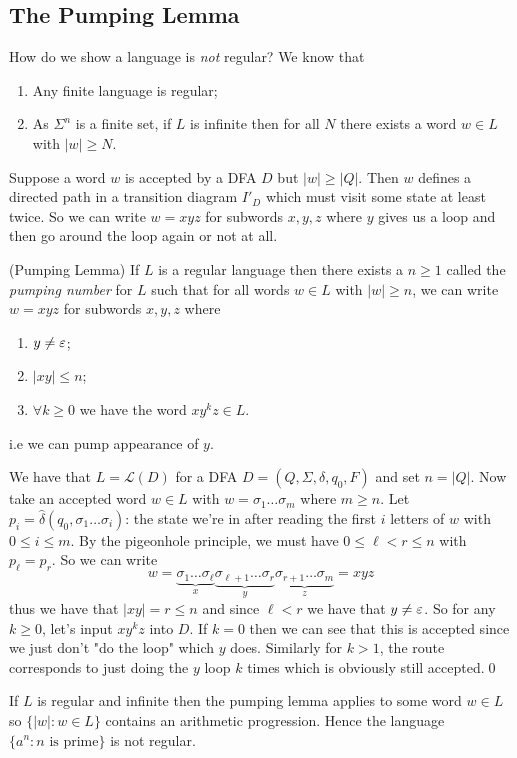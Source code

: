 \documentclass[tikx, border = 10pt]{article}
\begin{document}
\subsection{The Pumping Lemma}
How do we show a language is \textit{not} regular? We know that
\begin{enumerate}
	\item Any finite language is regular;
	\item As $ \Sigma^n $ is a finite set, if $ L $ is infinite then for all $ N $ there exists a word $ w\in L $ with $ |w| \ge N $.
\end{enumerate}
Suppose a word $ w $ is accepted by a DFA $ D $ but $ |w|\ge |Q| $. Then $ w $ defines a directed path in a transition diagram $ I'_D $ which must visit some state at least twice. So we can write $ w = xyz $ for subwords $ x,y,z $ where $ y $ gives us a loop and then go around the loop again or not at all.
\begin{theorem}
	(Pumping Lemma) If $ L $ is a regular language then there exists a $ n\ge 1 $ called the \textit{pumping number} for $ L $ such that for all words $ w\in L $ with $ |w|\ge n $, we can write $ w=xyz $ for subwords $ x,y,z $ where
	\begin{enumerate}
		\item $ y\ne \varepsilon $;
		\item $ |xy|\le n $;
		\item $ \forall k\ge 0 $ we have the word $ xy^kz\in L $.
	\end{enumerate}
	i.e we can pump appearance of $ y $.
\end{theorem}
\pf We have that $ L=\mathcal L(D) $ for a DFA $ D = (Q,\Sigma,\delta,q_0,F) $ and set $ n=|Q| $. Now take an accepted word $ w\in L $ with $ w = \sigma_1\dots\sigma_m $ where $ m\ge n $. Let $ p_i = \hat\delta(q_0, \sigma_1\dots \sigma_i) $: the state we're in after reading the first $ i $ letters of $ w $ with $ 0\le i \le m $. By the pigeonhole principle, we must have $ 0\le \ell < r\le n $ with $ p_\ell = p_r $. So we can write \[ 
	w = \underbrace{\sigma_1\dots \sigma_\ell}_{x}\underbrace{\sigma_{\ell+1}\dots \sigma_r}_y\underbrace{\sigma_{r+1}\dots \sigma_m}_z = xyz
\]
thus we have that $ |xy| =r \le n $ and since $ \ell<r $ we have that $ y\ne \varepsilon $. So for any $ k\ge 0 $, let's input $ xy^kz $ into $ D $. If $ k=0 $ then we can see that this is accepted since we just don't "do the loop" which $ y $ does. Similarly for $ k>1 $, the route corresponds to just doing the $ y $ loop $ k $ times which is obviously still accepted.\qed
\begin{example}
	If $ L $ is regular and infinite then the pumping lemma applies to some word $ w\in L $ so $ \{|w|: w\in L\} $ contains an arithmetic progression. Hence the language $ \{a^n: n \text{ is prime}\} $ is not regular.
\end{example}
\end{document}
